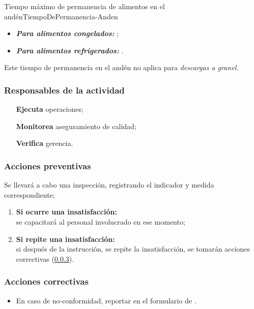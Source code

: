 

\begin{nota}{Tiempo máximo de permanencia de alimentos en el andén}{TiempoDePermanencia-Anden}
	\begin{itemize}
		\item \emph{\textbf{Para alimentos congelados:}} \TiempoAndenCong;
		\item \emph{\textbf{Para alimentos refrigerados:}} \TiempoAndenRefri.
	\end{itemize}
	Este tiempo de permanencia en el andén no aplica para \emph{descargas a granel.}
\end{nota}

\subsubsection{Responsables de la actividad}
\begin{itemize}
	\item[\textbf{Ejecuta}] operaciones;
	\item[\textbf{Monitorea}] aseguramiento de calidad;
	\item[\textbf{Verifica}] gerencia.
\end{itemize}

\subsubsection{Acciones preventivas}
Se llevará a cabo una inspección, registrando el indicador y medida correspondiente;
\begin{enumerate}
	\item \textbf{Si ocurre una insatisfacción:}\\ se capacitará al personal involucrado en ese momento;
	\item \textbf{Si repite una insatisfacción:}\\ si después de la instrucción, se repite la insatisfacción, se tomarán acciones correctivas (\cref{sec:2.1:acc}).
\end{enumerate}

\subsubsection{Acciones correctivas}\label{sec:2.1:acc}
\begin{itemize}
	\item En caso de no-conformidad, reportar en el formulario de {\slshape \RAC.}
\end{itemize}

